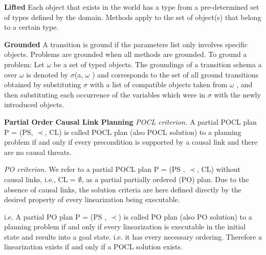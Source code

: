 \textbf{Lifted}
Each object that exists in the world has a type from a pre-determined set of types defined by the domain.
Methods apply to the set of object(s) that belong to a certain type.

\textbf{Grounded}
A transition is ground if the parameters list only involves specific objects. 
Problems are grounded when all methods are grounded. To ground a problem: Let $\omega$ be a set of typed objects. The groundings of
a transition schema a over $\omega$  is denoted by $\sigma$(a, $\omega$ ) and corresponds to the set of all ground transitions obtained by
substituting $\sigma$ with a list of compatible objects taken from $\omega$ , and then substituting each occurrence of the variables
which were in $\sigma$ with the newly introduced objects.  

\textbf{Partial Order Causal Link Planning}
\emph{POCL criterion.} A partial POCL plan P = (PS, $\prec$, CL) is called POCL plan (also POCL solution) to a planning problem if and only if every precondition is supported by a causal link and there are no causal threats.

\emph{PO criterion.} We refer to a partial POCL plan P = (PS , $\prec$, CL) without causal links, i.e., CL = $\emptyset$, as a partial partially ordered (PO) plan. Due to the absence of causal links, the solution criteria are here defined directly by the desired property of every linearization being executable.

i.e. A partial PO plan P = (PS , $\prec$) is called PO plan (also PO solution) to a planning problem if and only
if every linearization is executable in the initial state and results into a goal state.
i.e. it has every necessary ordering. Therefore a linearization exists if and only if a POCL solution exists.